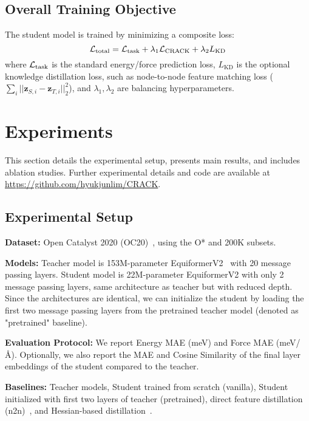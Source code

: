 \documentclass{article}
\begin{document}
\subsection{Overall Training Objective}

The student model is trained by minimizing a composite loss:
$$ \mathcal{L}_{\text{total}} = \mathcal{L}_{\text{task}} + \lambda_1 \mathcal{L}_{\text{CRACK}} + \lambda_2 L_{\text{KD}} $$
where $\mathcal{L}_{\text{task}}$ is the standard energy/force prediction loss, $L_{\text{KD}}$ is the optional knowledge distillation loss, such as node-to-node feature matching loss ($\sum_i ||\mathbf{z}_{S,i} - \mathbf{z}_{T,i}||^2_2$), and $\lambda_1, \lambda_2$ are balancing hyperparameters.


\section{Experiments}
This section details the experimental setup, presents main results, and includes ablation studies.
Further experimental details and code are available at \href{https://github.com/hyukjunlim/CRACK}{https://github.com/hyukjunlim/CRACK}.


\subsection{Experimental Setup}
\textbf{Dataset:} Open Catalyst 2020 (OC20)~\citep{chanussot2021open}, using the O* and 200K subsets.

\textbf{Models:} Teacher model is 153M-parameter EquiformerV2~\citep{liao2023equiformerv2} with 20 message passing layers. Student model is 22M-parameter EquiformerV2 with only 2 message passing layers, same architecture as teacher but with reduced depth. 
Since the architectures are identical, we can initialize the student by loading the first two message passing layers from the pretrained teacher model (denoted as "pretrained" baseline).

\textbf{Evaluation Protocol:} We report Energy MAE (meV) and Force MAE (meV/Å). Optionally, we also report the MAE and Cosine Similarity of the final layer embeddings of the student compared to the teacher.

\textbf{Baselines:} Teacher models, Student trained from scratch (vanilla), Student initialized with first two layers of teacher (pretrained), direct feature distillation (n2n)~\citep{ekstrom2023accelerating}, and Hessian-based distillation~\citep{amin2025towards}.
\end{document}
